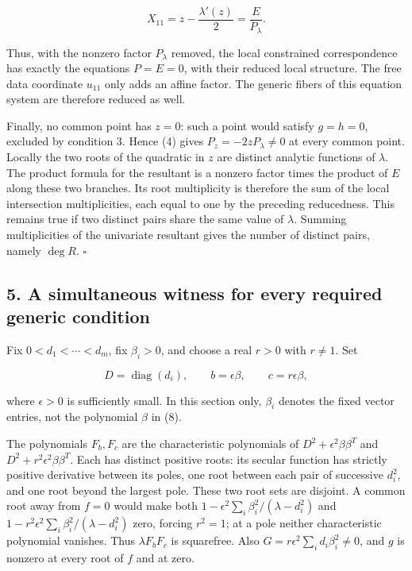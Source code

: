 \documentclass[10pt,a4paper]{article}
\begin{document}
\nopagebreak[4]

\[X_{11}=z-\frac{\lambda'(z)}2=\frac{E}{P_\lambda}.\]

Thus, with the nonzero factor \(P_\lambda\) removed, the local
constrained correspondence has exactly the equations \(P=E=0\), with
their reduced local structure. The free data coordinate \(u_{11}\) only
adds an affine factor. The generic fibers of this equation system are
therefore reduced as well.

Finally, no common point has \(z=0\): such a point would satisfy
\(g=h=0\), excluded by condition 3. Hence (4) gives
\(P_z=-2zP_\lambda\ne0\) at every common point. Locally the two roots of
the quadratic in \(z\) are distinct analytic functions of \(\lambda\).
The product formula for the resultant is a nonzero factor times the
product of \(E\) along these two branches. Its root multiplicity is
therefore the sum of the local intersection multiplicities, each equal
to one by the preceding reducedness. This remains true if two distinct
pairs share the same value of \(\lambda\). Summing multiplicities of the
univariate resultant gives the number of distinct pairs, namely
\(\deg R\). \(\square\)


\subsection{5. A simultaneous witness for every required generic
condition}\label{a-simultaneous-witness-for-every-required-generic-condition}

Fix \(0<d_1<\cdots<d_m\), fix \(\beta_i>0\), and choose a real \(r>0\)
with \(r\ne1\). Set

\nopagebreak[4]

\[D=\operatorname{diag}(d_i),\qquad b=\epsilon\beta,\qquad c=r\epsilon\beta,\]

where \(\epsilon>0\) is sufficiently small. In this section only,
\(\beta_i\) denotes the fixed vector entries, not the polynomial
\(\beta\) in (8).

The polynomials \(F_b,F_c\) are the characteristic polynomials of
\(D^2+\epsilon^2\beta\beta^T\) and \(D^2+r^2\epsilon^2\beta\beta^T\).
Each has distinct positive roots: its secular function has strictly
positive derivative between its poles, one root between each pair of
successive \(d_i^2\), and one root beyond the largest pole. These two
root sets are disjoint. A common root away from \(f=0\) would make both
\(1-\epsilon^2\sum_i\beta_i^2/(\lambda-d_i^2)\) and
\(1-r^2\epsilon^2\sum_i\beta_i^2/(\lambda-d_i^2)\) zero, forcing
\(r^2=1\); at a pole neither characteristic polynomial vanishes. Thus
\(\lambda F_bF_c\) is squarefree. Also
\(G=r\epsilon^2\sum_i d_i\beta_i^2\ne0\), and \(g\) is nonzero at every
root of \(f\) and at zero.
\end{document}
